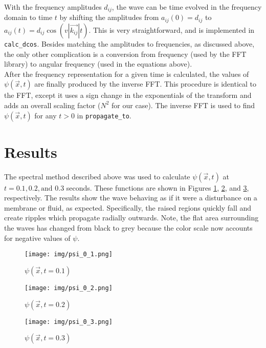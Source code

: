 \documentclass[12pt]{article}
\begin{document}
With the frequency amplitudes $d_{ij}$, the wave can be time evolved in the frequency domain to time $t$ by shifting the amplitudes from $a_{ij}(0)= d_{ij}$ to $a_{ij}(t) = d_{ij} \cos(v |\vec{k_{ij}}| t)$. This is very straightforward, and is implemented in \texttt{calc\_dcos}. Besides matching the amplitudes to frequencies, as discussed above, the only other complication is a conversion from frequency (used by the FFT library) to angular frequency (used in the equations above). \\

After the frequency representation for a given time is calculated, the values of $\psi(\vec{x}, t)$ are finally produced by the inverse FFT. This procedure is identical to the FFT, except it uses a sign change in the exponentials of the transform and adds an overall scaling factor ($N^2$ for our case). The inverse FFT is used to find $\psi(\vec{x}, t)$ for any $t>0$ in \texttt{propagate\_to}.
\section{Results}
The spectral method described above was used to calculate $\psi(\vec{x}, t)$ at $t = 0.1, 0.2, \text{and } 0.3$ seconds. These functions are shown in Figures \ref{f2}, \ref{f3}, and \ref{f4}, respectively. The results show the wave behaving as if it were a disturbance on a membrane or fluid, as expected. Specifically, the raised regions quickly fall and create ripples which propagate radially outwards. Note, the flat area surrounding the waves has changed from black to grey because the color scale now accounts for negative values of $\psi$.
\begin{figure}
  \centering
  \texttt{[image: img/psi\_0\_1.png]}
  \caption{$\psi(\vec{x}, t = 0.1)$}
  \label{f2}
\end{figure}
\begin{figure}
  \centering
  \texttt{[image: img/psi\_0\_2.png]}
  \caption{$\psi(\vec{x}, t = 0.2)$}
  \label{f3}
\end{figure}
\begin{figure}
  \centering
  \texttt{[image: img/psi\_0\_3.png]}
  \caption{$\psi(\vec{x}, t = 0.3)$}
  \label{f4}
\end{figure}
\clearpage
\end{document}
